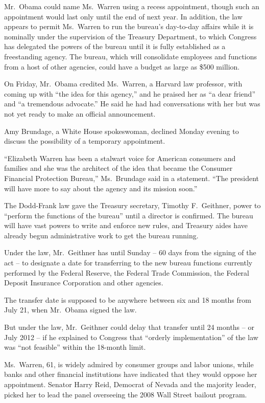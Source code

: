 ﻿\documentclass[12pt]{article}
\begin{document}
Mr.~Obama could name Ms.~Warren using a recess appointment, though such an appointment would last
only until the end of next year. In addition, the law appears to permit Ms.~Warren to run the
bureau's day-to-day affairs while it is nominally under the supervision of the Treasury Department,
to which Congress has delegated the powers of the bureau until it is fully established as a
freestanding agency. The bureau, which will consolidate employees and functions from a host of other
agencies, could have a budget as large as \$500 million.

On Friday, Mr.~Obama credited Ms.~Warren, a Harvard law professor, with coming up with ``the idea
for this agency,'' and he praised her as ``a dear friend'' and ``a tremendous advocate.'' He said he
had had conversations with her but was not yet ready to make an official announcement.

Amy Brundage, a White House spokeswoman, declined Monday evening to discuss the possibility of a
temporary appointment.

``Elizabeth Warren has been a stalwart voice for American consumers and families and she was the
architect of the idea that became the Consumer Financial Protection Bureau,'' Ms.~Brundage said in a
statement. ``The president will have more to say about the agency and its mission soon.''

The Dodd-Frank law gave the Treasury secretary, Timothy F.~Geithner, power to ``perform the
functions of the bureau'' until a director is confirmed. The bureau will have vast powers to write
and enforce new rules, and Treasury aides have already begun administrative work to get the bureau
running.

Under the law, Mr.~Geithner has until Sunday -- 60 days from the signing of the act -- to designate
a date for transferring to the new bureau functions currently performed by the Federal Reserve, the
Federal Trade Commission, the Federal Deposit Insurance Corporation and other agencies.

The transfer date is supposed to be anywhere between six and 18 months from July 21, when Mr.~Obama
signed the law.

But under the law, Mr.~Geithner could delay that transfer until 24 months -- or July 2012 -- if he
explained to Congress that ``orderly implementation'' of the law was ``not feasible'' within the
18-month limit.

Ms.~Warren, 61, is widely admired by consumer groups and labor unions, while banks and other
financial institutions have indicated that they would oppose her appointment. Senator Harry Reid,
Democrat of Nevada and the majority leader, picked her to lead the panel overseeing the 2008 Wall
Street bailout program.
\end{document}
